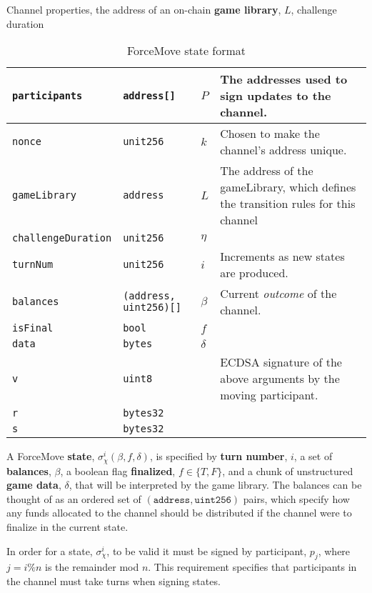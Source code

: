 \documentclass{article}
\theoremstyle{definition}
\begin{document}
Channel properties, the address of an on-chain \textbf{game library}, $L$,
challenge duration


\begin{table}[h]
  \begin{tabular}{|l|l|l|p{5cm}|}
    \hline
    \texttt{participants} & \texttt{address[]} & $P$ & The addresses used to sign updates to the channel. \\ \hline
    \texttt{nonce} & \texttt{unit256} & $k$ & Chosen to make the channel's address unique. \\ \hline
    \texttt{gameLibrary} & \texttt{address} & $L$ & The address of the gameLibrary, which defines the transition rules for this channel \\ \hline
    \texttt{challengeDuration} & \texttt{unit256} & $\eta$ & \\ \hline
    \texttt{turnNum} & \texttt{unit256} & $i$ & Increments as new states are produced. \\ \hline
    \texttt{balances} & \texttt{(address, uint256)[]} & $\beta$ & Current \textit{outcome} of the channel. \\ \hline
    \texttt{isFinal} & \texttt{bool} & $f$ & \\ \hline
    \texttt{data} & \texttt{bytes} & $\delta$ & \\ \hline
    \texttt{v} & \texttt{uint8} & &  ECDSA signature of the above arguments by the moving participant. \\ \cline{1-2}
    \texttt{r} & \texttt{bytes32} & & \\ \cline{1-2}
    \texttt{s} & \texttt{bytes32} & & \\ \hline
  \end{tabular}
  \caption{ForceMove state format}
  \label{table:force-move-state}
\end{table}

A ForceMove \textbf{state}, $\sigma_\chi^i(\beta, f, \delta)$, is specified by \textbf{turn number}, $i$,
a set of \textbf{balances}, $\beta$, a boolean flag \textbf{finalized}, $f \in \{T, F\}$, and
a chunk of unstructured \textbf{game data}, $\delta$, that will be interpreted by the game library. The
balances can be thought of as an ordered set of $(\texttt{address}, \texttt{uint256})$ pairs,
which specify how any funds allocated to the channel should be distributed if the channel 
were to finalize in the current state.

In order for a state, $\sigma_\chi^i$, to be valid it must be signed by participant, $p_j$,
where $j = i \% n$ is the remainder mod $n$. This requirement specifies that participants
in the channel must take turns when signing states.
\end{document}
